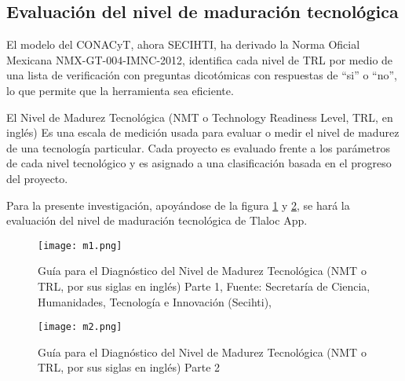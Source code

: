 \subsection{Evaluación del nivel de maduración tecnológica}

El modelo del CONACyT, ahora SECIHTI, ha derivado la Norma Oficial Mexicana NMX-GT-004-IMNC-2012, identifica cada nivel de TRL por medio de una lista de verificación con preguntas dicotómicas con respuestas de ``si'' o ``no'', lo que permite que la herramienta sea eficiente.


El Nivel de Madurez Tecnológica (NMT o Technology Readiness Level, TRL, en inglés) 
Es una escala de medición usada para evaluar o medir el nivel de madurez de una
tecnología particular. Cada proyecto es evaluado frente a los parámetros de cada
nivel tecnológico y es asignado a una clasificación basada en el progreso del
proyecto.

Para la presente investigación, apoyándose de la figura \ref{m1} y \ref{m2}, se hará la evaluación del nivel de maduración tecnológica de Tlaloc App.

\begin{figure}[ht]
\centering
  \texttt{[image: m1.png]}
  \caption{Guía para el Diagnóstico del Nivel de Madurez Tecnológica (NMT o TRL, por sus siglas en inglés) Parte 1, Fuente: Secretaría de Ciencia, Humanidades, Tecnología e Innovación (Secihti),}
  \label{m1}
\end{figure}
\begin{figure}[ht]
\centering
  \texttt{[image: m2.png]}
  \caption{Guía para el Diagnóstico del Nivel de Madurez Tecnológica (NMT o TRL, por sus siglas en inglés) Parte 2}
  \label{m2}
\end{figure}

